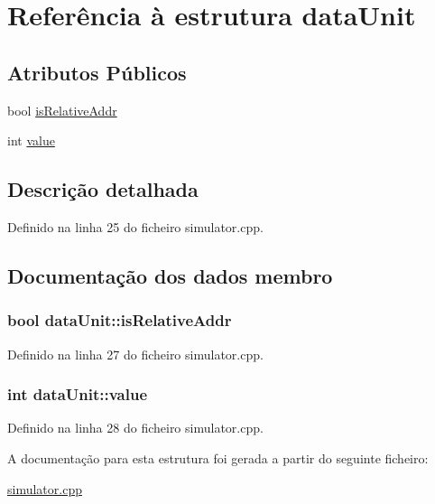 \hypertarget{structdata_unit}{\section{Referência à estrutura data\-Unit}
\label{structdata_unit}
}
\subsection*{Atributos Públicos}
\begin{DoxyCompactItemize}
\item 
bool \hyperlink{structdata_unit_aab8231c269276586aa32eebf53d3a4b8}{is\-Relative\-Addr}
\item 
int \hyperlink{structdata_unit_ac357340d1cfd318cef897090f579b469}{value}
\end{DoxyCompactItemize}


\subsection{Descrição detalhada}


Definido na linha 25 do ficheiro simulator.\-cpp.



\subsection{Documentação dos dados membro}
\hypertarget{structdata_unit_aab8231c269276586aa32eebf53d3a4b8}{
\subsubsection[{is\-Relative\-Addr}]{\setlength{\rightskip}{0pt plus 5cm}bool data\-Unit\-::is\-Relative\-Addr}}\label{structdata_unit_aab8231c269276586aa32eebf53d3a4b8}


Definido na linha 27 do ficheiro simulator.\-cpp.

\hypertarget{structdata_unit_ac357340d1cfd318cef897090f579b469}{
\subsubsection[{value}]{\setlength{\rightskip}{0pt plus 5cm}int data\-Unit\-::value}}\label{structdata_unit_ac357340d1cfd318cef897090f579b469}


Definido na linha 28 do ficheiro simulator.\-cpp.



A documentação para esta estrutura foi gerada a partir do seguinte ficheiro\-:\begin{DoxyCompactItemize}
\item 
\hyperlink{simulator_8cpp}{simulator.\-cpp}\end{DoxyCompactItemize}
